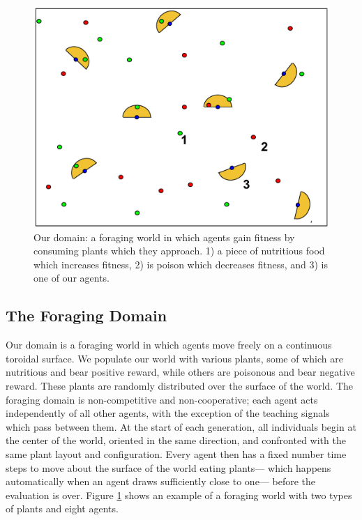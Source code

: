 \documentclass{acm_proc_article-sp}
\begin{document}
\begin{figure}[t]
  \centering
    \includegraphics[scale=.31]{world.pdf}
  \caption{Our domain: a foraging world in which agents gain fitness by consuming plants which they approach.  1) a piece of nutritious food which increases fitness, 2) is poison which decreases fitness, and 3) is one of our agents.}
  \label{fig:foraging-world}
\end{figure}

\subsection*{The Foraging Domain}
Our domain is a foraging world in which agents move freely on a continuous toroidal surface. We populate our world with various plants, some of which are nutritious and bear positive reward, while others are poisonous and bear negative reward. These plants are randomly distributed over the surface of the world. The foraging domain is non-competitive and non-cooperative; each agent acts independently of all other agents, with the exception of the teaching signals which pass between them. At the start of each generation, all individuals begin at the center of the world, oriented in the same direction, and confronted with the same plant layout and configuration. Every agent then has a fixed number time steps to move about the surface of the world eating plants--- which happens automatically when an agent draws sufficiently close to one--- before the evaluation is over. Figure \ref{fig:foraging-world} shows an example of a foraging world with two types of plants and eight agents.
    
\end{document}

